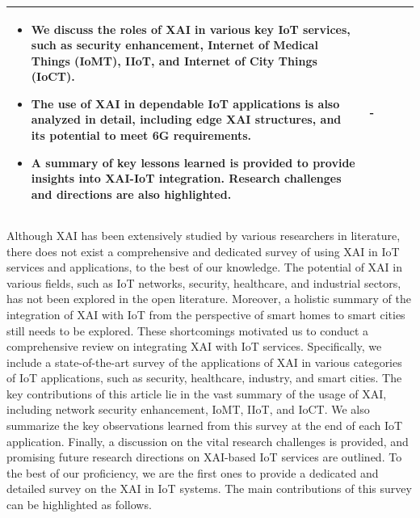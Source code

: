\documentclass[journal]{IEEEtran}
\begin{document}
\begin{table}[!ht]
\begin{tabular}{|p{0.45cm}|p{0.5cm}|p{2.0cm}|p{7.45cm}|p{5.5cm}|}
\begin{itemize}
    \item We discuss the roles of XAI in various key IoT services, such as security enhancement, Internet of Medical Things (IoMT), IIoT, and Internet of City Things (IoCT).
    \item The use of XAI in dependable IoT applications is also analyzed in detail, including edge XAI structures, and its potential to meet 6G requirements.
    \item A summary of key lessons learned is provided to provide insights into XAI-IoT integration. Research challenges and directions are also highlighted.
\end{itemize}  &  - \\ \hline

\end{tabular}
\end{table}

Although XAI has been extensively studied by various researchers in literature, there does not exist a comprehensive and dedicated survey of using XAI in IoT services and applications, to the best of our knowledge. The potential of XAI in various fields, such as IoT networks, security, healthcare, and industrial sectors, has not been explored in the open literature. Moreover, a holistic summary of the integration of XAI with IoT from the perspective of smart homes to smart cities still needs to be explored. These shortcomings motivated us to conduct a comprehensive review on integrating XAI with IoT services. Specifically, we include a state-of-the-art survey of the applications of XAI in various categories of IoT applications, such as security, healthcare, industry, and smart cities. The key contributions of this article lie in the vast summary of the usage of XAI, including network security enhancement, IoMT, IIoT, and IoCT. We also summarize the key observations learned from this survey at the end of each IoT application. Finally, a discussion on the vital research challenges is provided, and promising future research directions on XAI-based IoT services are outlined. To the best of our proficiency, we are the first ones to provide a dedicated and detailed survey on the XAI in IoT systems. The main contributions of this survey can be highlighted as follows.
\end{document}
